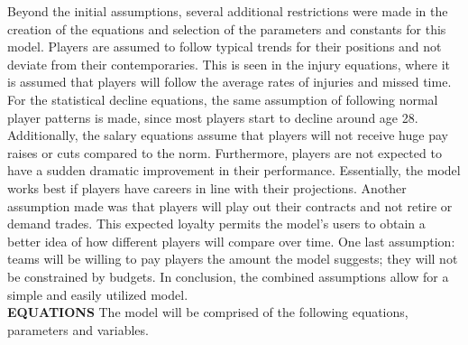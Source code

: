 \documentclass[12pt]{article}
\begin{document}
Beyond the initial assumptions, several additional restrictions were made in the creation of the equations and selection of the parameters and constants for this model.  Players are assumed to follow typical trends for their positions and not deviate from their contemporaries.  This is seen in the injury equations, where it is assumed that players will follow the average rates of injuries and missed time.  For the statistical decline equations, the same assumption of following normal player patterns is made, since most players start to decline around age 28.  Additionally, the salary equations assume that players will not receive huge pay raises or cuts compared to the norm. Furthermore, players are not expected to have a sudden dramatic improvement in their performance.  Essentially, the model works best if players have careers in line with their projections.  Another assumption made was that players will play out their contracts and not retire or demand trades.  This expected loyalty permits the model's users to obtain a better idea of how different players will compare over time.  One last assumption: teams will be willing to pay players the amount the model suggests; they will not be constrained by budgets.  In conclusion, the combined assumptions allow for a simple and easily utilized model.  \\
\vskip 2pt
\textbf{EQUATIONS}
\vskip 2pt
The model will be comprised of the following equations, parameters and variables. \\
\end{document}
